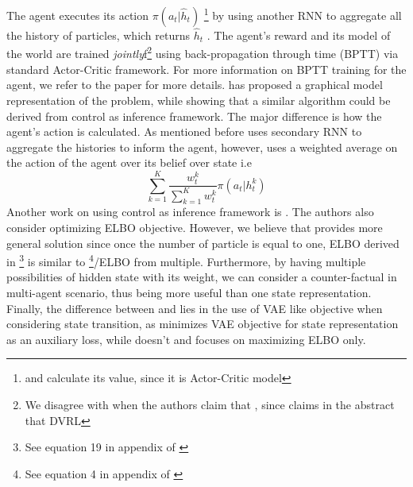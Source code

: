 The agent executes its action $\pi(a_t | \hat{h}_t)$ \footnote{and calculate its value, since it is Actor-Critic model} by using another RNN to aggregate all the history of particles, which returns $\hat{h}_t$ . The agent's reward and its model of the world are trained \textit{jointly}f\footnote{We disagree with \cite{huangsvqn} when the authors claim that \cite{igl2018deep} , since \cite{igl2018deep} claims in the abstract that DVRL } using back-propagation through time (BPTT) via standard Actor-Critic framework. For more information on BPTT training for the agent, we refer to the paper for more details. \cite{shvechikovjoint} has proposed a graphical model representation of the problem, while showing that a similar algorithm could be derived from control as inference framework. The major difference is how the agent's action is calculated. As mentioned before \cite{igl2018deep} uses secondary RNN to aggregate the histories to inform the agent, however, \cite{shvechikovjoint} uses a weighted average on the action of the agent over its belief over state i.e
\begin{equation}
    \sum^K_{k=1} \frac{w^k_{t}}{\sum^K_{k=1}w^k_{t}} \pi(a_t | h_t^k)
\end{equation}
Another work on using control as inference framework is \cite{huangsvqn}. The authors also consider optimizing ELBO objective. However, we believe that \cite{shvechikovjoint} provides more general solution since once the number of particle is equal to one, ELBO derived in \cite{huangsvqn}\footnote{See equation 19 in appendix of \cite{huangsvqn}} is similar to \cite{shvechikovjoint}\footnote{See equation 4 in appendix of \cite{shvechikovjoint}}/ELBO from multiple. Furthermore, by having multiple possibilities of hidden state with its weight, we can consider a counter-factual in multi-agent scenario, thus being more useful than one state representation. Finally, the difference between \cite{huangsvqn} and \cite{shvechikovjoint} lies in the use of VAE like objective when considering state transition, as \cite{huangsvqn} minimizes VAE objective for state representation as an auxiliary loss, while \cite{shvechikovjoint} doesn't and focuses on maximizing ELBO only.